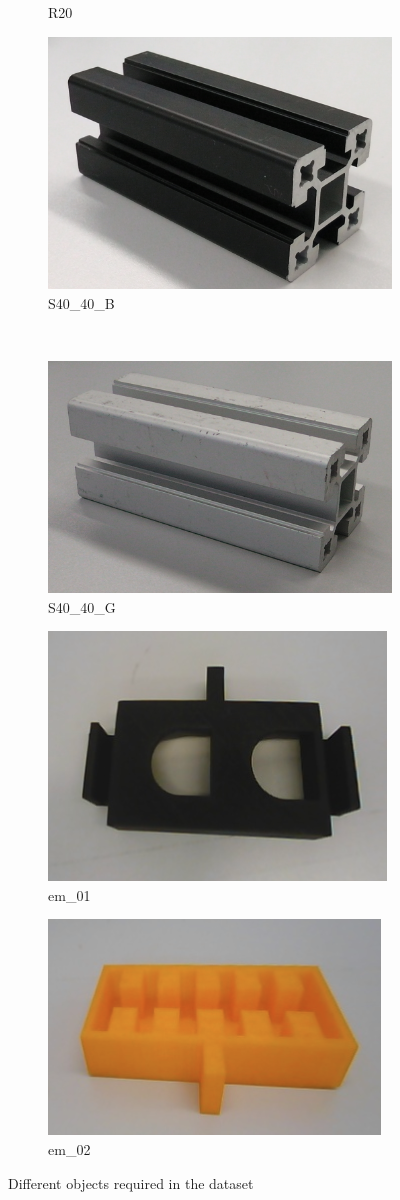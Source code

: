 \begin{figure}[!htb]
\begin{subfigure}{.3\textwidth}
  \caption{R20 \cite{github_robocup@work}}
  \label{fig:R20}
\end{subfigure}
\begin{subfigure}{.3\textwidth}
  \centering
  \includegraphics[width=.5\linewidth]{images/S40_40_B}
  \caption{S40\_40\_B \cite{github_robocup@work}}
  \label{fig:S40_40_B}
\end{subfigure}\\
\vspace{3mm}
\begin{subfigure}{.3\textwidth}
  \centering
  \includegraphics[width=.5\linewidth]{images/S40_40_G}
  \caption{S40\_40\_G \cite{github_robocup@work}}
  \label{fig:S40_40_G}
\end{subfigure}
\begin{subfigure}{.3\textwidth}
  \centering
  \includegraphics[width=.5\linewidth]{images/em_01}
  \caption{em\_01}
  \label{fig:em_01}
\end{subfigure}
\begin{subfigure}{.3\textwidth}
  \centering
  \includegraphics[width=.5\linewidth]{images/em_02}
  \caption{em\_02}
  \label{fig:em_02}
\end{subfigure}
\caption{Different objects required in the dataset}
\label{Fig:objects}
\end{figure}

